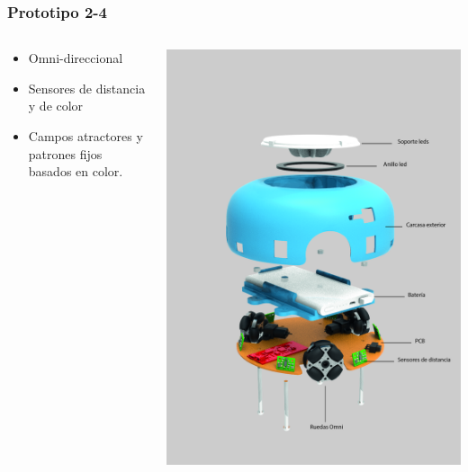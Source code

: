 \documentclass[spanish]{beamer}
\begin{document}
\begin{frame}
	\frametitle{Prototipo 2-4}
	\begin{columns}[T]
		\begin{column}{.5\textwidth}
			\vspace{1em}
			\begin{itemize}
				\item Omni-direccional
				\item Sensores de distancia y de color
				\item Campos atractores y patrones fijos basados en color.
			\end{itemize}
		\end{column}
		\begin{column}{.5\textwidth}
			\begin{center}
				\includegraphics[width=\textwidth]{render-componentes.png}
			\end{center}
		\end{column}
	\end{columns}
\end{frame}
\end{document}
